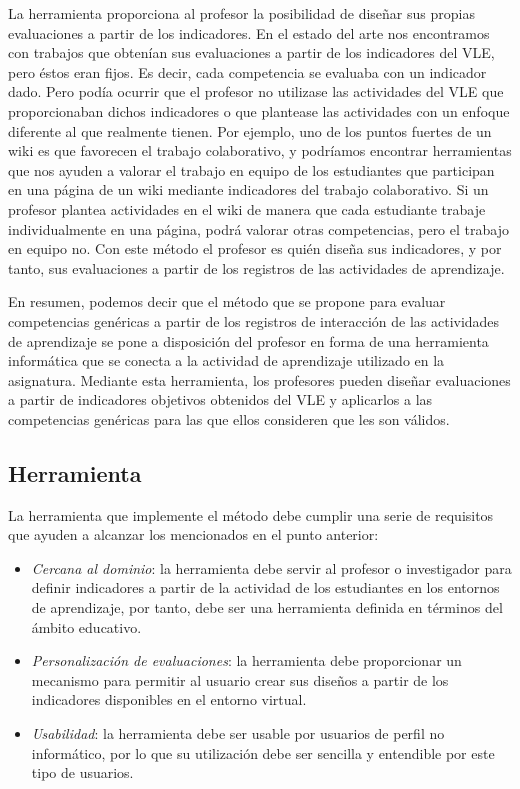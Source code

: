 La herramienta proporciona al profesor la posibilidad de diseñar sus propias evaluaciones a partir de los indicadores. En el estado del arte nos encontramos con trabajos que obtenían sus evaluaciones a partir de los indicadores del VLE, pero éstos eran fijos. Es decir, cada competencia se evaluaba con un indicador dado. Pero podía ocurrir que el profesor no utilizase las actividades del VLE que proporcionaban dichos indicadores o que plantease las actividades con un enfoque diferente al que realmente tienen. Por ejemplo, uno de los puntos fuertes de un wiki es que favorecen el trabajo colaborativo, y podríamos encontrar herramientas que nos ayuden a valorar el trabajo en equipo de los estudiantes que participan en una página de un wiki mediante indicadores del trabajo colaborativo. Si un profesor plantea actividades en el wiki de manera que cada estudiante trabaje individualmente en una página, podrá valorar otras competencias, pero el trabajo en equipo no. Con este método el profesor es quién diseña sus indicadores, y por tanto, sus evaluaciones a partir de los registros de las actividades de aprendizaje.

En resumen, podemos decir que el método que se propone para evaluar competencias genéricas a partir de los registros de interacción de las actividades de aprendizaje se pone a disposición del profesor en forma de una herramienta informática que se conecta a la actividad de aprendizaje utilizado en la asignatura. Mediante esta herramienta, los profesores pueden diseñar evaluaciones a partir de indicadores objetivos obtenidos del VLE y aplicarlos a las competencias genéricas para las que ellos consideren que les son válidos.

\subsection{Herramienta}

La herramienta que implemente el método debe cumplir una serie de requisitos que ayuden a alcanzar los mencionados en el punto anterior:

\begin{itemize}
\item \emph{Cercana al dominio}: la herramienta debe servir al profesor o investigador para definir indicadores a partir de la actividad de los estudiantes en los entornos de aprendizaje, por tanto, debe ser una herramienta definida en términos del ámbito educativo.
\item \emph{Personalización de evaluaciones}: la herramienta debe proporcionar un mecanismo para permitir al usuario crear sus diseños a partir de los indicadores disponibles en el entorno virtual.
\item \emph{Usabilidad}: la herramienta debe ser usable por usuarios de perfil no informático, por lo que su utilización debe ser sencilla y entendible por este tipo de usuarios.
\end{itemize}

